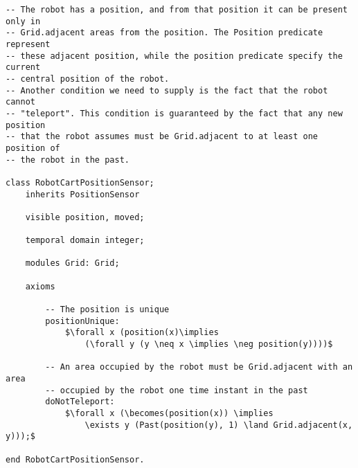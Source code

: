 \begin{lstlisting}[fontadjust, mathescape, frame=single] 
-- The robot has a position, and from that position it can be present only in
-- Grid.adjacent areas from the position. The Position predicate represent 
-- these adjacent position, while the position predicate specify the current 
-- central position of the robot.
-- Another condition we need to supply is the fact that the robot cannot 
-- "teleport". This condition is guaranteed by the fact that any new position
-- that the robot assumes must be Grid.adjacent to at least one position of 
-- the robot in the past.

class RobotCartPositionSensor; 
    inherits PositionSensor
    
    visible position, moved;
    
    temporal domain integer;

    modules Grid: Grid;
    
    axioms
    
        -- The position is unique
        positionUnique: 
            $\forall x (position(x)\implies 
                (\forall y (y \neq x \implies \neg position(y))))$            

        -- An area occupied by the robot must be Grid.adjacent with an area
        -- occupied by the robot one time instant in the past
        doNotTeleport:
            $\forall x (\becomes(position(x)) \implies 
                \exists y (Past(position(y), 1) \land Grid.adjacent(x, y)));$
            
end RobotCartPositionSensor.
\end{lstlisting}